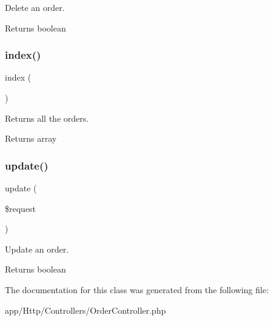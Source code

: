 Delete an order.

\begin{DoxyReturn}{Returns}
boolean 
\end{DoxyReturn}
\mbox{\label{class_app_1_1_http_1_1_controllers_1_1_order_controller_a149eb92716c1084a935e04a8d95f7347}} 
\subsubsection{\texorpdfstring{index()}{index()}}
{\footnotesize\ttfamily index (\begin{DoxyParamCaption}{ }\end{DoxyParamCaption})}

Returns all the orders.

\begin{DoxyReturn}{Returns}
array 
\end{DoxyReturn}
\mbox{\label{class_app_1_1_http_1_1_controllers_1_1_order_controller_ab7b27a90191560dcef32126b0945db0d}} 
\subsubsection{\texorpdfstring{update()}{update()}}
{\footnotesize\ttfamily update (\begin{DoxyParamCaption}\item[{}]{\$request }\end{DoxyParamCaption})}

Update an order.

\begin{DoxyReturn}{Returns}
boolean 
\end{DoxyReturn}


The documentation for this class was generated from the following file\+:\begin{DoxyCompactItemize}
\item 
app/\+Http/\+Controllers/Order\+Controller.\+php\end{DoxyCompactItemize}
